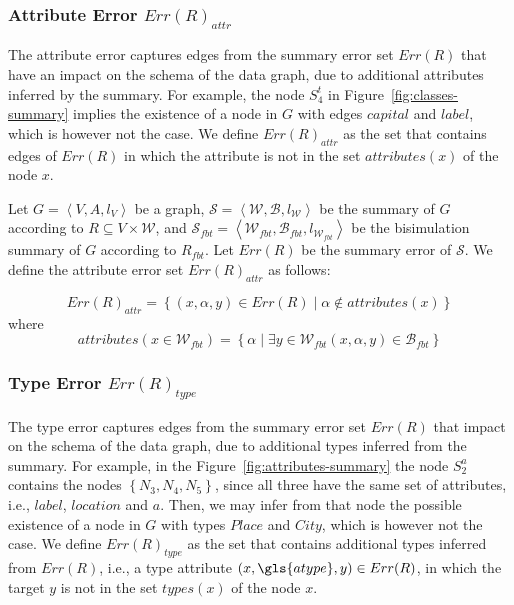 \subsubsection{Attribute Error $Err(R)_{attr}$}

The attribute error captures edges from the summary error set $Err(R)$ that have an impact on the schema of the data graph, due to additional attributes inferred by the summary. For example, the node $S^t_4$ in Figure~\ref{fig:classes-summary} implies the existence of a node in $G$ with edges $capital$ and $label$, which is however not the case. We define $Err(R)_{attr}$ as the set that contains edges of $Err(R)$ in which the attribute is not in the set $attributes(x)$ of the node $x$.

\begin{definition}
	Let $G=\left\langle V, A, l_V \right\rangle$ be a graph, $\mathcal{S} = \left\langle \mathcal{W}, \mathcal{B}, l_{\mathcal{W}} \right\rangle$ be the summary of $G$ according to $R \subseteq V \times \mathcal{W}$, and $\mathcal{S}_{fbt} = \left\langle \mathcal{W}_{fbt}, \mathcal{B}_{fbt}, l_{\mathcal{W}_{fbt}} \right\rangle$ be the bisimulation summary of $G$ according to $R_{fbt}$. Let $Err(R)$ be the summary error of $\mathcal{S}$. We define the attribute error set $Err(R)_{attr}$ as follows:

	$$
	Err(R)_{attr} = \left\lbrace (x, \alpha, y) \in Err(R) \mid \alpha \not \in attributes(x) \right\rbrace
	$$
	where
	$$
	attributes(x \in \mathcal{W}_{fbt}) = \left\lbrace \alpha \mid \exists y \in \mathcal{W}_{fbt} (x, \alpha, y) \in \mathcal{B}_{fbt} \right\rbrace
	$$
\end{definition}

\subsubsection{Type Error $Err(R)_{type}$}

The type error captures edges from the summary error set $Err(R)$ that impact on the schema of the data graph, due to additional types inferred from the summary.
For example, in the Figure~\ref{fig:attributes-summary} the node $S^a_2$ contains the nodes $\left\lbrace N_3, N_4, N_5 \right\rbrace$, since all three have the same set of attributes, i.e., $label$, $location$ and $a$. Then, we may infer from that node the possible existence of a node in $G$ with types $Place$ and $City$, which is however not the case. We define $Err(R)_{type}$ as the set that contains additional types inferred from $Err(R)$, i.e., a type attribute $(x, \gls{atype}, y) \in Err(R)$, in which the target $y$ is not in the set $types(x)$ of the node $x$.

